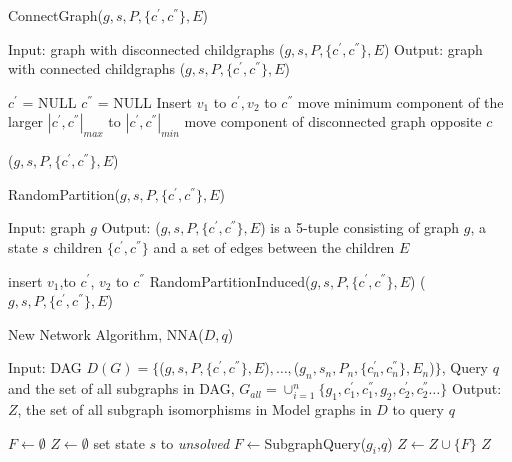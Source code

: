 \begin{algorithm}
\caption{ConnectGraph($g,s,P,\{c^{'},c^{''}\},E$)}
\label{alg:alg103}
\begin{algorithmic}
\STATE Input: graph with disconnected childgraphs ($g,s,P,\{c^{'},c^{''}\},E$)
\STATE Output: graph with connected childgraphs ($g,s,P,\{c^{'},c^{''}\},E$)
\end{algorithmic}
\begin{algorithmic}[1]
\STATE $c^{'}$ = NULL
\STATE $c^{''}$ = NULL
   \STATE Insert $v_{1}$ to $c^{'}, v_{2}$ to $c^{''}$
\ELSE 
    \STATE move minimum component of the larger $|c^{'},c^{''}|_{max}$ to  $|c^{'},c^{''}|_{min}$
  \ELSE
    \STATE move component of disconnected graph opposite $c$
  \ENDIF

 \ENDWHILE
\ENDIF
\RETURN ($g,s,P,\{c^{'},c^{''}\},E$)
\end{algorithmic}
\end{algorithm}


\begin{algorithm}
\caption{RandomPartition($g,s,P,\{c^{'},c^{''}\},E$)}
\label{alg:alg104}
\begin{algorithmic}
\STATE Input: graph $g$
\STATE Output: ($g,s,P,\{c^{'},c^{''}\},E$) is a 5-tuple consisting of graph $g$, a state $s$ children $\{c^{'},c^{''}\}$  and a set of edges between the children $E$ 
\end{algorithmic}
\begin{algorithmic}[1]
    \STATE insert $v_1$,to $c^{'}$, $v_2$ to $c^{''}$    
 \ELSE
   \STATE RandomPartitionInduced($g,s,P,\{c^{'},c^{''}\},E$)
\ENDIF
\RETURN ($g,s,P,\{c^{'},c^{''}\},E$)
\end{algorithmic}
\end{algorithm}


\begin{algorithm}
\caption{New Network Algorithm, NNA($D , q$)}
\label{alg:alg105}
\begin{algorithmic}
\STATE Input: DAG $D(G)= \{$($g,s,P,\{c^{'},c^{''}\},E$)$,\ldots,$($g_n,s_n,P_n,\{c_n^{'},c_n^{''}\},E_n$)$ \}$, Query $q$
\STATE and the set of all subgraphs in DAG, $G_{all} = \cup_{i=1}^n \{g_1 ,c_1^{'},c_1^{''},g_2 ,c_2^{'},c_2^{''}\ldots \}$ 
\STATE Output: $Z$, the set of all subgraph isomorphisms in Model graphs in $D$ to query $q$ 
\end{algorithmic}
\begin{algorithmic}[1]
\STATE $F \leftarrow \emptyset$
\STATE $Z \leftarrow \emptyset$
  \STATE set state $s$ to \textit{unsolved}
\ENDFOR
{}
   \STATE $F \leftarrow $SubgraphQuery($g_i$,$q$)
      \STATE $Z \leftarrow Z \cup \{F\}$
   \ENDIF
\ENDFOR
\RETURN $Z$
\end{algorithmic}
\end{algorithm}


